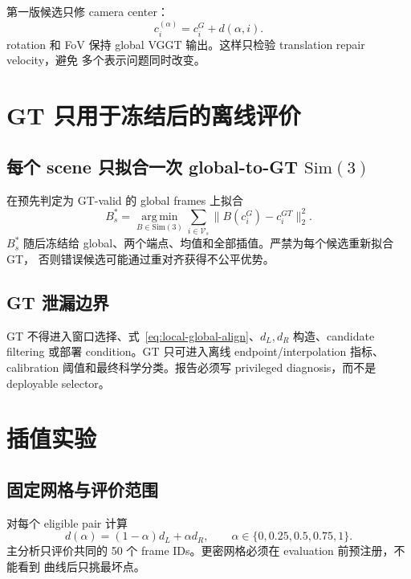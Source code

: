 \documentclass[UTF8,a4paper,11pt]{ctexart}
\newcommand{\Sim}{\mathrm{Sim}}
\newcommand{\argminop}{\operatorname*{arg\,min}}
\begin{document}
第一版候选只修 camera center：
\begin{equation}
  c_i^{(\alpha)}=c_i^G+d(\alpha,i).
\end{equation}
rotation 和 FoV 保持 global VGGT 输出。这样只检验 translation repair velocity，避免
多个表示问题同时改变。

\section{GT 只用于冻结后的离线评价}

\subsection{每个 scene 只拟合一次 global-to-GT $\Sim(3)$}

在预先判定为 GT-valid 的 global frames 上拟合
\begin{equation}
  B_s^*=\argminop_{B\in\Sim(3)}
  \sum_{i\in\mathcal V_s}\|B(c_i^G)-c_i^{GT}\|_2^2.
  \label{eq:global-gt-align}
\end{equation}
$B_s^*$ 随后冻结给 global、两个端点、均值和全部插值。严禁为每个候选重新拟合 GT，
否则错误候选可能通过重对齐获得不公平优势。

\subsection{GT 泄漏边界}

GT 不得进入窗口选择、式~\eqref{eq:local-global-align}、$d_L,d_R$ 构造、candidate
filtering 或部署 condition。GT 只可进入离线 endpoint/interpolation 指标、calibration
阈值和最终科学分类。报告必须写 privileged diagnosis，而不是 deployable selector。

\section{插值实验}

\subsection{固定网格与评价范围}

对每个 eligible pair 计算
\begin{equation}
  d(\alpha)=(1-\alpha)d_L+\alpha d_R,
  \qquad \alpha\in\{0,0.25,0.5,0.75,1\}.
  \label{eq:alpha-grid}
\end{equation}
主分析只评价共同的 50 个 frame IDs。更密网格必须在 evaluation 前预注册，不能看到
曲线后只挑最坏点。
\end{document}
